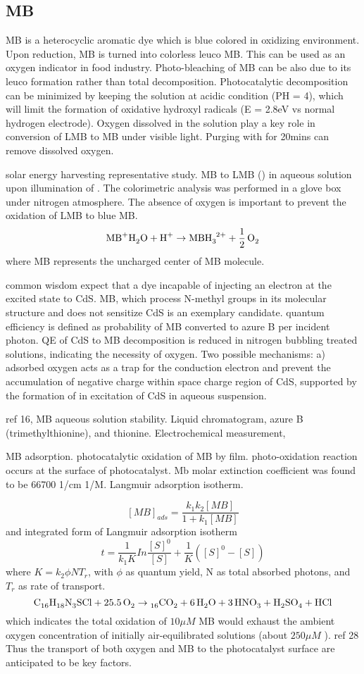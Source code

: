 \subsection{MB}
MB is a heterocyclic aromatic dye which is blue colored in oxidizing environment. Upon reduction, MB is turned into colorless leuco MB. This can be used as an oxygen indicator in food industry. Photo-bleaching of MB can be also due to its leuco formation rather than total decomposition. Photocatalytic decomposition can be minimized by keeping the solution at acidic condition (PH = 4), which will limit the formation of oxidative hydroxyl radicals (E = 2.8eV vs normal hydrogen electrode). Oxygen dissolved in the solution play a key role in conversion of LMB to MB under visible light. Purging with  for 20mins can remove dissolved oxygen. \cite{Wang2014a}

solar energy harvesting representative study.\cite{Yoneyama1972} MB to LMB () in aqueous solution upon illumination of . The colorimetric analysis was performed in a glove box under nitrogen atmosphere. The absence of oxygen is important to prevent the oxidation of LMB to blue MB.
\[
\cee{MB^+ H2O + H^+ \rightarrow MBH3^{2+} + 1/2O2}
\]
where MB represents the uncharged center of MB molecule.

common wisdom expect that a dye incapable of injecting an electron at the excited state to CdS. MB, which process N-methyl groups in its molecular structure and does not sensitize CdS is an exemplary candidate. quantum efficiency is defined as probability of MB converted to azure B per incident photon. QE of CdS to MB decomposition is reduced in nitrogen bubbling treated solutions, indicating the necessity of oxygen. Two possible mechanisms: a) adsorbed oxygen acts as a trap for the conduction electron and prevent the accumulation of negative charge within space charge region of CdS, supported by the formation of  in excitation of CdS in aqueous suspension.\cite{Takizawa1978}

ref 16, MB aqueous solution stability. Liquid chromatogram, azure B (trimethylthionine), and thionine. Electrochemical measurement,

MB adsorption.  photocatalytic oxidation of MB by  film. photo-oxidation reaction occurs at the surface of photocatalyst. Mb molar extinction coefficient was found to be 66700 1/cm 1/M. Langmuir adsorption isotherm.\cite{Matthews1989}

\[
[MB]_{ads} = \frac{k_1 k_2 [MB]}{1 + k_1[MB]}
\]
and integrated form of Langmuir adsorption isotherm
\[
t = \frac{1}{k_1K} In\frac{[S]^0}{[S]} + \frac{1}{K}([S]^0 - [S])
\]
where $K = k_2 \phi N T_r$, with $\phi$ as quantum yield, N as total absorbed photons, and $T_r$ as rate of transport.
\[
\cee{C16H18N3SCl + 25.5O2 \rightarrow 16CO2 + 6H2O + 3HNO3 + H2SO4 +HCl}
\]
which indicates the total oxidation of $10 \mu M$ MB would exhaust the ambient oxygen concentration of initially air-equilibrated solutions (about $250 \mu M$ ). ref 28 Thus the transport of both oxygen and MB to the photocatalyst surface are anticipated to be key factors.

